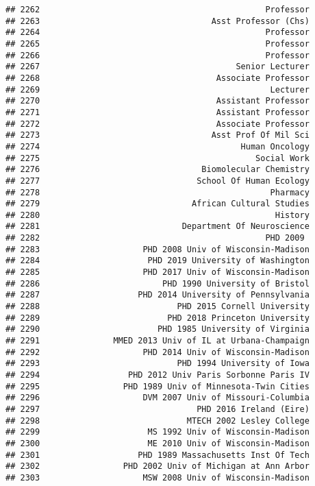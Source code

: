 \documentclass[
]{article}
\begin{document}
\begin{verbatim}
## 2262                                              Professor
## 2263                                   Asst Professor (Chs)
## 2264                                              Professor
## 2265                                              Professor
## 2266                                              Professor
## 2267                                        Senior Lecturer
## 2268                                    Associate Professor
## 2269                                               Lecturer
## 2270                                    Assistant Professor
## 2271                                    Assistant Professor
## 2272                                    Associate Professor
## 2273                                   Asst Prof Of Mil Sci
## 2274                                         Human Oncology
## 2275                                            Social Work
## 2276                                 Biomolecular Chemistry
## 2277                                School Of Human Ecology
## 2278                                               Pharmacy
## 2279                               African Cultural Studies
## 2280                                                History
## 2281                             Department Of Neuroscience
## 2282                                              PHD 2009 
## 2283                     PHD 2008 Univ of Wisconsin-Madison
## 2284                      PHD 2019 University of Washington
## 2285                     PHD 2017 Univ of Wisconsin-Madison
## 2286                         PHD 1990 University of Bristol
## 2287                    PHD 2014 University of Pennsylvania
## 2288                            PHD 2015 Cornell University
## 2289                          PHD 2018 Princeton University
## 2290                        PHD 1985 University of Virginia
## 2291               MMED 2013 Univ of IL at Urbana-Champaign
## 2292                     PHD 2014 Univ of Wisconsin-Madison
## 2293                            PHD 1994 University of Iowa
## 2294                  PHD 2012 Univ Paris Sorbonne Paris IV
## 2295                 PHD 1989 Univ of Minnesota-Twin Cities
## 2296                     DVM 2007 Univ of Missouri-Columbia
## 2297                                PHD 2016 Ireland (Eire)
## 2298                              MTECH 2002 Lesley College
## 2299                      MS 1992 Univ of Wisconsin-Madison
## 2300                      ME 2010 Univ of Wisconsin-Madison
## 2301                    PHD 1989 Massachusetts Inst Of Tech
## 2302                 PHD 2002 Univ of Michigan at Ann Arbor
## 2303                     MSW 2008 Univ of Wisconsin-Madison

\end{verbatim}
\end{document}
